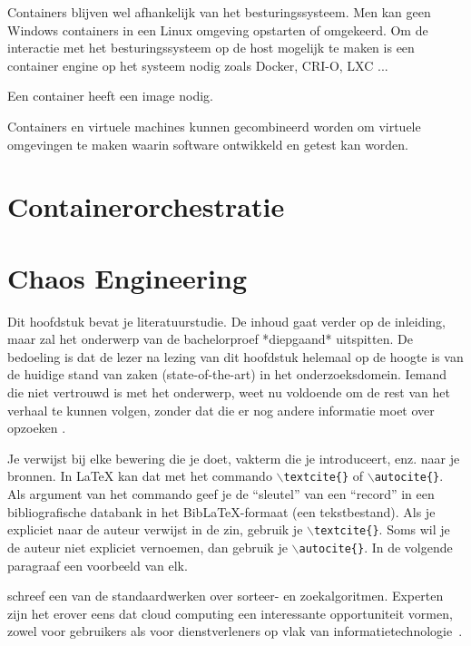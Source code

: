 Containers blijven wel afhankelijk van het besturingssysteem. Men kan geen Windows containers in een Linux omgeving opstarten of omgekeerd. Om de interactie met het besturingssysteem op de host mogelijk te maken is een container engine op het systeem nodig zoals Docker, CRI-O, LXC ... 

Een container heeft een image nodig.   

Containers en virtuele machines kunnen gecombineerd worden om virtuele omgevingen te maken waarin software ontwikkeld en getest kan worden.

\section{Containerorchestratie}

\section{Chaos Engineering}
  
Dit hoofdstuk bevat je literatuurstudie. De inhoud gaat verder op de inleiding, maar zal het onderwerp van de bachelorproef *diepgaand* uitspitten. De bedoeling is dat de lezer na lezing van dit hoofdstuk helemaal op de hoogte is van de huidige stand van zaken (state-of-the-art) in het onderzoeksdomein. Iemand die niet vertrouwd is met het onderwerp, weet nu voldoende om de rest van het verhaal te kunnen volgen, zonder dat die er nog andere informatie moet over opzoeken \autocite{Pollefliet2011}.

Je verwijst bij elke bewering die je doet, vakterm die je introduceert, enz. naar je bronnen. In \LaTeX{} kan dat met het commando \texttt{$\backslash${textcite\{\}}} of \texttt{$\backslash${autocite\{\}}}. Als argument van het commando geef je de ``sleutel'' van een ``record'' in een bibliografische databank in het Bib\LaTeX{}-formaat (een tekstbestand). Als je expliciet naar de auteur verwijst in de zin, gebruik je \texttt{$\backslash${}textcite\{\}}.
Soms wil je de auteur niet expliciet vernoemen, dan gebruik je \texttt{$\backslash${}autocite\{\}}. In de volgende paragraaf een voorbeeld van elk.

\textcite{Knuth1998} schreef een van de standaardwerken over sorteer- en zoekalgoritmen. Experten zijn het erover eens dat cloud computing een interessante opportuniteit vormen, zowel voor gebruikers als voor dienstverleners op vlak van informatietechnologie~\autocite{Creeger2009}.

\lipsum[7-20]

